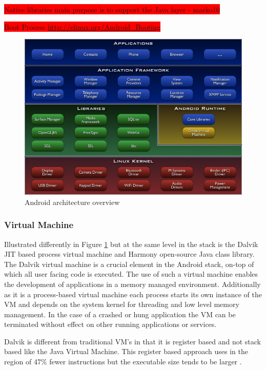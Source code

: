 \colorbox{red}{Native libraries main purpose is to support the Java layer - marko10}

\colorbox{red}{Boot Process \url{http://elinux.org/Android_Booting}}

\begin{figure}[h!]
\centering
    \includegraphics[width=1\textwidth]{research/images/android_arch.png}
    \caption{Android architecture overview}%
    \label{android_arch}
\end{figure}

\subsubsection{Virtual Machine}
Illustrated differently in Figure \ref{android_arch} but at the same level in the stack is the Dalvik JIT based process virtual machine and Harmony open-source Java class library. The Dalvik virtual machine is a crucial element in the Android stack, on-top of which all user facing code is executed.  The use of such a virtual machine enables the development of applications in a memory managed environment. Additionally as it is a process-based virtual machine each process starts its own instance of the VM and depends on the system kernel for threading and low level memory management. In the case of a crashed or hung application the VM can be terminated without effect on other running applications or services.

Dalvik is different from traditional VM’s in that it is register based and not stack based like the Java Virtual Machine. This register based approach uses in the region of 47\% fewer instructions but the executable size tends to be larger \cite{ehringerdalvik10}.

